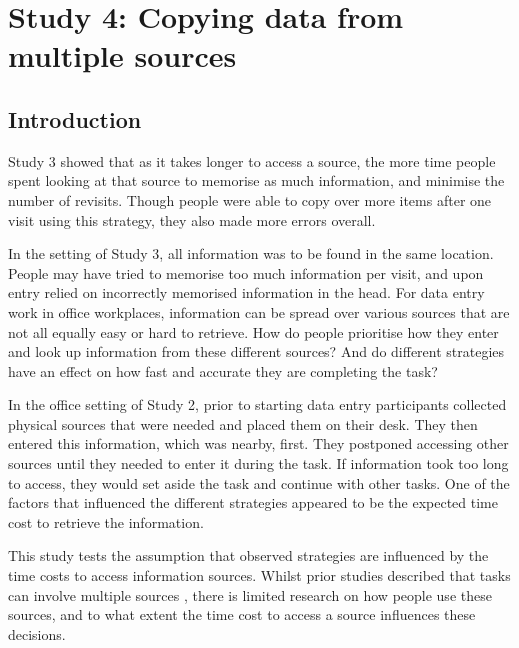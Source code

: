 \begin{table}
\section{Study 4: Copying data from multiple sources}
 
\subsection{Introduction}
Study 3 showed that as it takes longer to access a source, the more time people spent looking at that source to memorise as much information, and minimise the number of revisits. Though people were able to copy over more items after one visit using this strategy, they also made more errors overall. 

In the setting of Study 3, all information was to be found in the same location. People may have tried to memorise too much information per visit, and upon entry relied on incorrectly memorised information in the head. 
For data entry work in office workplaces, information can be spread over various sources that are not all equally easy or hard to retrieve. How do people prioritise how they enter and look up information from these different sources? And do different strategies have an effect on how fast and accurate they are completing the task? 


In the office setting of Study 2, prior to starting data entry participants collected physical sources that were needed and placed them on their desk. They then entered this information, which was nearby, first. They postponed accessing other sources until they needed to enter it during the task. If information took too long to access, they would set aside the task and continue with other tasks. One of the factors that influenced the different strategies appeared to be the expected time cost to retrieve the information. 

This study tests the assumption that observed strategies are influenced by the time costs to access information sources. Whilst prior studies described that tasks can involve multiple sources \citep{Cangiano2009, Su2013}, there is limited research on how people use these sources, and to what extent the time cost to access a source influences these decisions.


\end{table}
